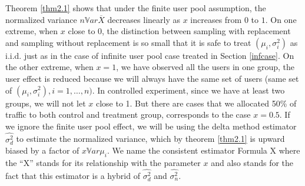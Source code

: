 \documentclass[10pt]{article}
\newcommand{\wht}{\widehat}
\newcommand{\var}{\ensuremath{\mathbb Var}}
\newcommand{\xbar}{\overline{X}}
\newcommand{\naiveest}{\wht{\sigma^2_n}}
\newcommand{\deltaest}{\wht{\sigma^2_d}}
\begin{document}
Theorem \ref{thm2.1} shows that under the finite user pool assumption, the normalized variance $n\var \xbar$ decreases linearly  as $x$ increases from $0$ to $1$. On one extreme, when $x$ close to 0, the distinction between sampling with replacement and sampling without replacement is so small that it is safe to treat $(\mu_i,\sigma_i^2)$ as i.i.d. just as in the case of infinite user pool case treated in Section \ref{infcase}. On the other extreme, when $x=1$, we have observed all the users in one group, the user effect is reduced because we will always have the same set of users (same set of $(\mu_i,\sigma_i^2), i=1,\dots,n)$. In controlled experiment, since we have at least two groups, we will not let $x$ close to 1. But there are cases that we allocated 50\% of traffic to both control and treatment group, corresponds to the case $x=0.5$. If we ignore the finite user pool effect, we will be using the delta method estimator $\deltaest$ to estimate the normalized variance, which by theorem \ref{thm2.1} is upward biased by a factor of $x \var \mu_i$. We name the consistent estimator Formula X where the ``X'' stands for its relationship with the parameter $x$ and also stands for the fact that this estimator is a hybrid of $\deltaest$ and $\naiveest$. 
\end{document}
